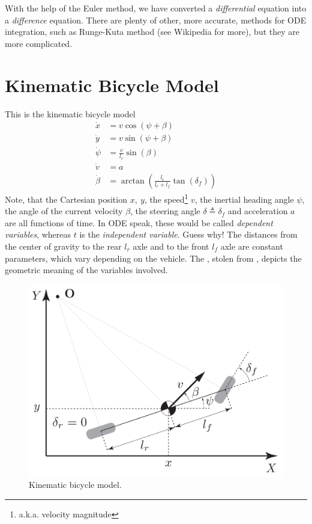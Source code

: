 \documentclass[a4paper]{article}
\begin{document}
With the help of the Euler method, we have converted a \emph{differential} equation into a \emph{difference} equation.
There are plenty of other, more accurate, methods for ODE integration, such as Runge-Kuta method (see Wikipedia for more), but they are more complicated.



\section{Kinematic Bicycle Model}\label{sec:kinematic_bicycle_model}
This is the kinematic bicycle model
\begin{subequations}
\begin{align}\label{eq:kinematic_bicycle_model_continuous}
\dot{x} 	&=  v \cos(\psi + \beta) \\
\dot{y} 	&=  v \sin(\psi + \beta) \\
\dot{\psi} 	&=  \frac{v}{l_r} \sin(\beta) \\
\dot{v} 	&=  a \\
\dot{\beta} &= \arctan\left(\frac{l_r}{l_r + l_f}\tan(\delta_f)\right)
\end{align}
\end{subequations}
Note, that the Cartesian position \( x,\ y \), the speed\footnote{a.k.a. velocity magnitude} \( v \), the inertial heading angle \( \psi \), the angle of the current velocity \( \beta \), the steering angle \( \delta \triangleq \delta_f \) and acceleration \( a \) are all functions of time.
In ODE speak, these would be called \emph{dependent variables}, whereas \( t \) is the \emph{independent variable}.
Guess why!
The distances from the center of gravity to the rear \( l_r \) axle and to the front \( l_f \) axle are constant parameters, which vary depending on the vehicle.
The , stolen from \cite{Kong2015}, depicts the geometric meaning of the variables involved.
\begin{figure}[h]
	\centering
	\includegraphics[scale=0.2]{./img/kinematic_bicycle_model.png}
	\caption{Kinematic bicycle model.}
	\label{fig:kinematic_bicycle_model}
\end{figure}
\end{document}
